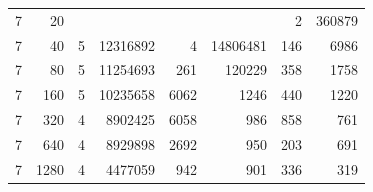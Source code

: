 \begin{table}[p]
\begin{minipage}[c]{0.49\textwidth}
\begin{tabular}{|rr|rr|rr|rr|}
\num{7} &   \num{20} &         &                &            &                &   \num{2} & \num{360879} \\
\num{7} &   \num{40} & \num{5} & \num{12316892} &    \num{4} & \num{14806481} & \num{146} &   \num{6986} \\
\num{7} &   \num{80} & \num{5} & \num{11254693} &  \num{261} &   \num{120229} & \num{358} &   \num{1758} \\
\num{7} &  \num{160} & \num{5} & \num{10235658} & \num{6062} &     \num{1246} & \num{440} &   \num{1220} \\
\num{7} &  \num{320} & \num{4} &  \num{8902425} & \num{6058} &      \num{986} & \num{858} &    \num{761} \\
\num{7} &  \num{640} & \num{4} &  \num{8929898} & \num{2692} &      \num{950} & \num{203} &    \num{691} \\
\num{7} & \num{1280} & \num{4} &  \num{4477059} &  \num{942} &      \num{901} & \num{336} &    \num{319} \\
\hline

\end{tabular}
\end{minipage}
\end{table}
